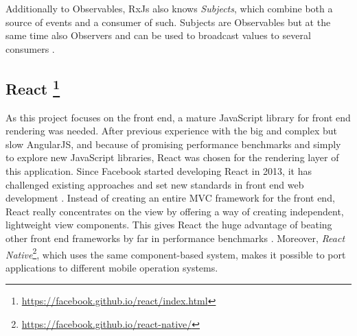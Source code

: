 Additionally to Observables, RxJs also knows \emph{Subjects}, which combine both a source of events and a consumer of such. Subjects are Observables but at the same time also Observers and can be used to broadcast values to several consumers \cite{rxjs-docu}.

\subsection[React]%
             {React%
             \protect\footnote{\url{https://facebook.github.io/react/index.html}}}%
\label{sec:implementation-technologies-react}

As this project focuses on the front end, a mature JavaScript library for front end rendering was needed. After previous experience with the big and complex but slow AngularJS, and because of promising performance benchmarks \cite{react-benchmarks} and simply to explore new JavaScript libraries, React was chosen for the rendering layer of this application. Since Facebook started developing React in 2013, it has challenged existing approaches and set new standards in front end web development \cite{introduction-to-react}. Instead of creating an entire MVC framework for the front end, React really concentrates on the view by offering a way of creating independent, lightweight view components. This gives React the huge advantage of beating other front end frameworks by far in performance benchmarks \cite{react-benchmarks}. Moreover, \emph{React Native}\footnote{\url{https://facebook.github.io/react-native/}}, which uses the same component-based system, makes it possible to port applications to different mobile operation systems.

